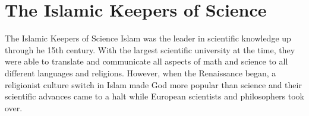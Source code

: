 \section{The Islamic Keepers of Science}
\begin{frame}{The Islamic Keepers of Science}{}
	Islam was the leader in scientific knowledge up through he 15th century. With the largest scientific university at the time, they were able to translate and communicate all aspects of math and science to all different languages and religions. However, when the Renaissance began, a religionist culture switch in Islam made God more popular than science and their scientific advances came to a halt while European scientists and philosophers took over. 
\end{frame}
